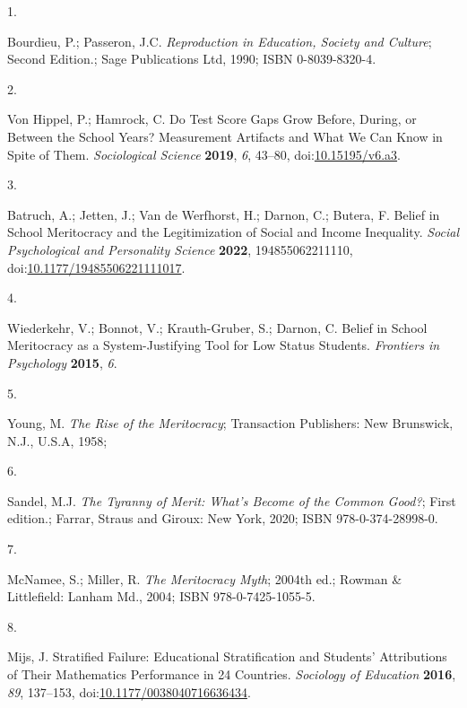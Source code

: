 \documentclass[
  12pt,
  letterpaper,
]{article}
\newlength{\cslhangindent}
\newlength{\csllabelwidth}
\newenvironment{CSLReferences}[2] %
 {\begin{list}{}{%
  \setlength{\itemindent}{0pt}
  \setlength{\leftmargin}{0pt}
  \setlength{\parsep}{0pt}
  \ifodd #1
   \setlength{\leftmargin}{\cslhangindent}
   \setlength{\itemindent}{-1\cslhangindent}
  \fi
  \setlength{\itemsep}{#2\baselineskip}}}
 {\end{list}}
\newcommand{\CSLLeftMargin}[1]{\parbox[t]{\csllabelwidth}{\strut#1\strut}}
\newcommand{\CSLRightInline}[1]{\parbox[t]{\linewidth - \csllabelwidth}{\strut#1\strut}}
\begin{document}
\label{refs}
\begin{CSLReferences}{0}{0}
\CSLLeftMargin{1. }%
\CSLRightInline{Bourdieu, P.; Passeron, J.C. \emph{Reproduction in
{Education}, {Society} and {Culture}}; Second Edition.; Sage
Publications Ltd, 1990; ISBN 0-8039-8320-4.}

\CSLLeftMargin{2. }%
\CSLRightInline{Von Hippel, P.; Hamrock, C. Do {Test Score Gaps Grow}
Before, During, or Between the {School Years}? {Measurement Artifacts}
and {What We Can Know} in {Spite} of {Them}. \emph{Sociological Science}
\textbf{2019}, \emph{6}, 43--80,
doi:\href{https://doi.org/10.15195/v6.a3}{10.15195/v6.a3}.}

\CSLLeftMargin{3. }%
\CSLRightInline{Batruch, A.; Jetten, J.; Van de Werfhorst, H.; Darnon,
C.; Butera, F. Belief in {School Meritocracy} and the {Legitimization}
of {Social} and {Income Inequality}. \emph{Social Psychological and
Personality Science} \textbf{2022}, 194855062211110,
doi:\href{https://doi.org/10.1177/19485506221111017}{10.1177/19485506221111017}.}

\CSLLeftMargin{4. }%
\CSLRightInline{Wiederkehr, V.; Bonnot, V.; Krauth-Gruber, S.; Darnon,
C. Belief in School Meritocracy as a System-Justifying Tool for Low
Status Students. \emph{Frontiers in Psychology} \textbf{2015},
\emph{6}.}

\CSLLeftMargin{5. }%
\CSLRightInline{Young, M. \emph{The Rise of the Meritocracy};
Transaction Publishers: New Brunswick, N.J., U.S.A, 1958;}

\CSLLeftMargin{6. }%
\CSLRightInline{Sandel, M.J. \emph{The Tyranny of Merit: {What}'s Become
of the Common Good?}; First edition.; {Farrar, Straus and Giroux}: New
York, 2020; ISBN 978-0-374-28998-0.}

\CSLLeftMargin{7. }%
\CSLRightInline{McNamee, S.; Miller, R. \emph{The Meritocracy Myth};
2004th ed.; Rowman \& Littlefield: Lanham Md., 2004; ISBN
978-0-7425-1055-5.}

\CSLLeftMargin{8. }%
\CSLRightInline{Mijs, J. Stratified {Failure}: {Educational
Stratification} and {Students}' {Attributions} of {Their Mathematics
Performance} in 24 {Countries}. \emph{Sociology of Education}
\textbf{2016}, \emph{89}, 137--153,
doi:\href{https://doi.org/10.1177/0038040716636434}{10.1177/0038040716636434}.}


\end{CSLReferences}
\end{document}

